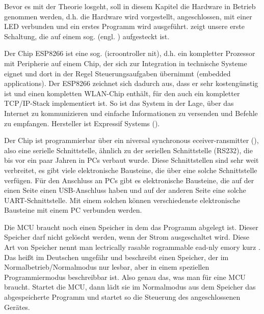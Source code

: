 

Bevor es mit der Theorie losgeht, soll in diesem Kapitel die Hardware in Betrieb genommen werden, d.h. 
die Hardware wird vorgestellt, angeschlossen, mit einer LED verbunden und ein erstes Programm wird ausgeführt.
 zeigt unsere erste Schaltung, die auf einem sog.  (engl. ) 
aufgesteckt ist.

\pagebreak{}


Der Chip ESP8266 ist eine sog.  (icroontroller nit), d.h. ein kompletter Prozessor mit Peripherie auf einem Chip, der sich zur Integration in technische Systeme eignet und dort in der Regel Steuerungsaufgaben übernimmt (embedded applications).
Der ESP8266 zeichnet sich dadurch aus, dass er sehr kostengünstig ist und einen kompletten WLAN-Chip enthält, für den auch ein kompletter TCP/IP-Stack implementiert ist. So ist das System in der Lage, über das Internet zu kommunizieren und einfache Informationen zu versenden und Befehle zu empfangen. Hersteller ist Expressif Systems ().



Der Chip ist programmierbar über ein niversal synchronous eceiver-ransmitter (), also eine serielle Schnittstelle, ähnlich zu der seriellen Schnittstelle (RS232), die bis vor ein paar Jahren in PCs verbaut wurde. Diese Schnittstellen sind sehr weit verbreitet, es gibt viele elektronische Bausteine, die über eine solche
Schnittstelle verfügen. Für den Anschluss an PCs gibt es elektronische Bausteine, die auf der einen Seite einen USB-Anschluss haben und auf der anderen Seite eine
solche UART-Schnittstelle. Mit einem solchen  können verschiedenste elektronische Bausteine mit einem PC verbunden werden.


Die MCU braucht noch einen Speicher in dem das Programm abgelegt ist. Dieser Speicher darf nicht gelöscht werden, wenn der Strom ausgeschaltet wird. Diese Art von Speicher nennt man lectrically rasable rogrammable ead-nly emory kurz .
Das heißt im Deutschen ungefähr  und beschreibt einen Speicher, der im Normalbetrieb/Normal\-modus
nur lesbar, aber in einem speziellen Programmiermodus beschreibbar ist. Also genau das, was man für eine MCU braucht. Startet die MCU, dann lädt sie im Normalmodus
aus dem Speicher das abgespeicherte Programm und startet so die Steuerung des angeschlossenen Gerätes. 

